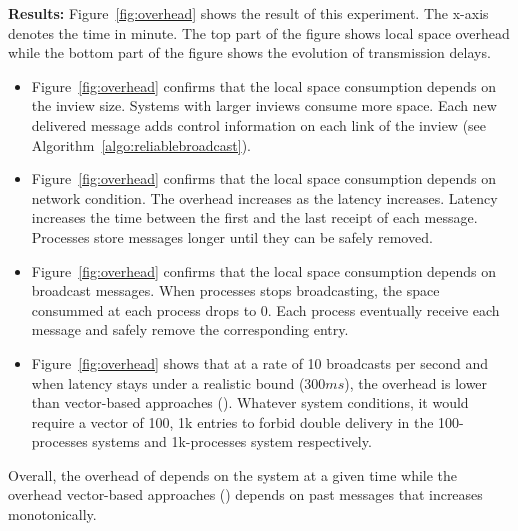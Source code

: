 \noindent \textbf{Results:} Figure~\ref{fig:overhead} shows the result
of this experiment. The x-axis denotes the time in minute. The top
part of the figure shows local space overhead while the bottom part of
the figure shows the evolution of transmission delays.
\begin{itemize}
\item Figure~\ref{fig:overhead} confirms that the local space
  consumption depends on the inview size. Systems with larger inviews
  consume more space. Each new delivered message adds control information on
  each link of the inview (see Algorithm~\ref{algo:reliablebroadcast}).
\item Figure~\ref{fig:overhead} confirms that the local space
  consumption depends on network condition. The overhead increases as
  the latency increases. Latency increases the time between the first
  and the last receipt of each message. Processes store messages
  longer until they can be safely removed.
\item Figure~\ref{fig:overhead} confirms that the local space
  consumption depends on broadcast messages. When processes stops
  broadcasting, the space consummed at each process drops to 0. Each
  process eventually receive each message and safely remove the
  corresponding entry.
\item Figure~\ref{fig:overhead} shows that at a rate of 10 broadcasts
  per second and when latency stays under a realistic bound ($300ms$),
  the overhead is lower than vector-based approaches (\REF). Whatever
  system conditions, it would require a vector of 100, 1k entries to
  forbid double delivery in the 100-processes systems and 1k-processes
  system respectively.
\end{itemize}

\noindent Overall, the overhead of \PCBROADCAST depends on the system
at a given time while the overhead vector-based approaches (\REF)
depends on past messages that increases monotonically.




